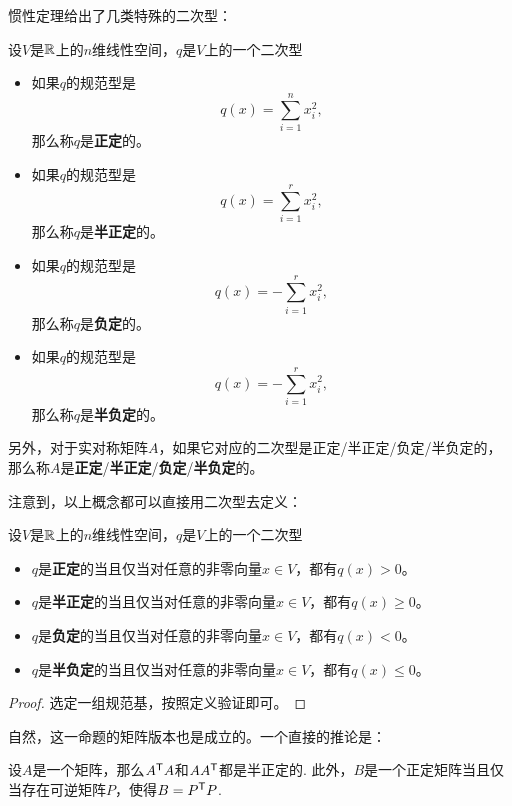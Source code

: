 惯性定理给出了几类特殊的二次型：

\begin{definition}\label{def:positive-definite}
    设$V$是$\mathbb{R}$上的$n$维线性空间，$q$是$V$上的一个二次型
    \begin{itemize}
        \item 如果$q$的规范型是
        \[
            q(x)=\sum_{i=1}^n x_i^2,
        \]
        那么称$q$是\textbf{正定}的。
        \item 如果$q$的规范型是
        \[
            q(x)=\sum_{i=1}^r x_i^2,
        \]
        那么称$q$是\textbf{半正定}的。
        \item 如果$q$的规范型是
        \[
            q(x)=-\sum_{i=1}^r x_i^2,
        \]
        那么称$q$是\textbf{负定}的。
        \item 如果$q$的规范型是
        \[
            q(x)=-\sum_{i=1}^r x_i^2,
        \]
        那么称$q$是\textbf{半负定}的。
    \end{itemize}
另外，对于实对称矩阵$A$，如果它对应的二次型是正定/半正定/负定/半负定的，那么称$A$是\textbf{正定}/\textbf{半正定}/\textbf{负定}/\textbf{半负定}的。
\end{definition}
注意到，以上概念都可以直接用二次型去定义：
\begin{proposition}\label{prop:positive-definite}
    设$V$是$\mathbb{R}$上的$n$维线性空间，$q$是$V$上的一个二次型
    \begin{itemize}
        \item $q$是\textbf{正定}的当且仅当对任意的非零向量$x\in V$，都有$q(x)>0$。
        \item $q$是\textbf{半正定}的当且仅当对任意的非零向量$x\in V$，都有$q(x)\geq 0$。
        \item $q$是\textbf{负定}的当且仅当对任意的非零向量$x\in V$，都有$q(x)<0$。
        \item $q$是\textbf{半负定}的当且仅当对任意的非零向量$x\in V$，都有$q(x)\leq 0$。
    \end{itemize}
\end{proposition}
\begin{proof}
    选定一组规范基，按照定义验证即可。
\end{proof}

自然，这一命题的矩阵版本也是成立的。一个直接的推论是：

\begin{corollary}\label{cor:positive-definite}
设$A$是一个矩阵，那么$A^{\mathsf{T}} A$和$AA^{\mathsf{T}}$都是半正定的. 此外，$B$是一个正定矩阵当且仅当存在可逆矩阵$P$，使得$B=P^{\mathsf{T}} P$.
\end{corollary}

